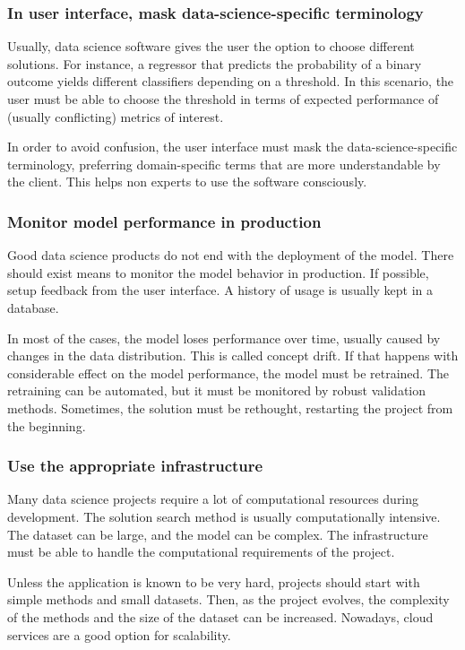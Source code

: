 \subsubsection{In user interface, mask data-science-specific terminology}

Usually, data science software gives the user the option to choose different solutions.
For instance, a regressor that predicts the probability of a binary outcome yields
different classifiers depending on a threshold.  In this scenario, the user must be able
to choose the threshold in terms of expected performance of (usually conflicting) metrics
of interest.

In order to avoid confusion, the user interface must mask the data-science-specific
terminology, preferring domain-specific terms that are more understandable by the client.
This helps non experts to use the software consciously.

\subsubsection{Monitor model performance in production}

Good data science products do not end with the deployment of the model.  There should
exist means to monitor the model behavior in production.  If possible, setup feedback from
the user interface.  A history of usage is usually kept in a database.

In most of the cases, the model loses performance over time, usually caused by changes in
the data distribution.  This is called concept drift.
If that happens with considerable effect on the model performance, the model must be
retrained.  The retraining can be automated, but it must be monitored by robust validation
methods. Sometimes, the solution must be rethought, restarting the project from the
beginning.

\subsubsection{Use the appropriate infrastructure}

Many data science projects require a lot of computational resources during development.
The solution search method is usually computationally intensive.  The dataset can be
large, and the model can be complex.  The infrastructure must be able to handle the
computational requirements of the project.

Unless the application is known to be very hard, projects should start with simple methods
and small datasets.  Then, as the project evolves, the complexity of the methods and the
size of the dataset can be increased.  Nowadays, cloud services are a good option for
scalability.

